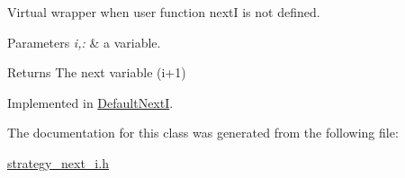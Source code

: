 \-Virtual wrapper when user function next\-I is not defined. 


\begin{DoxyParams}{\-Parameters}
{\em i,\-:} & a variable. \\
\hline
\end{DoxyParams}
\begin{DoxyReturn}{\-Returns}
\-The next variable (i+1) 
\end{DoxyReturn}


\-Implemented in \hyperlink{classDefaultNextI_aa44893d3fa6e8b167774ff85d798ec3b}{\-Default\-Next\-I}.



\-The documentation for this class was generated from the following file\-:\begin{DoxyCompactItemize}
\item 
\hyperlink{strategy__next__i_8h}{strategy\-\_\-next\-\_\-i.\-h}\end{DoxyCompactItemize}
